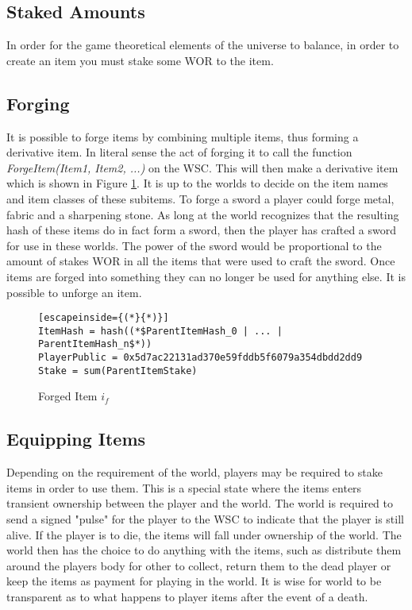 \documentclass[runningheads,a4paper]{llncs}
\begin{document}
\subsection{Staked Amounts}
In order for the game theoretical elements of the universe to balance, in order to create an item you must stake some WOR to the item.

\subsection{Forging}
It is possible to forge items by combining multiple items, thus forming a derivative item. In literal sense the act of forging it to call the function \textit{ForgeItem(Item1, Item2, ...)} on the WSC. This will then make a derivative item which is shown in Figure \ref{ForgedItem}. It is up to the worlds to decide on the item names and item classes of these subitems. To forge a sword a player could forge metal, fabric and a sharpening stone. As long at the world recognizes that the resulting hash of these items do in fact form a sword, then the player has crafted a sword for use in these worlds. The power of the sword would be proportional to the amount of stakes WOR in all the items that were used to craft the sword. Once items are forged into something they can no longer be used for anything else. It is possible to unforge an item.

\begin{figure}[H]
\centering
\caption{Forged Item $i_f$}
\label{ForgedItem}
\begin{lstlisting}[escapeinside={(*}{*)}]
ItemHash = hash((*$ParentItemHash_0 | ... | ParentItemHash_n$*))
PlayerPublic = 0x5d7ac22131ad370e59fddb5f6079a354dbdd2dd9
Stake = sum(ParentItemStake)
\end{lstlisting}
\end{figure}

\subsection{Equipping Items}
Depending on the requirement of the world, players may be required to stake items in order to use them. This is a special state where the items enters transient ownership between the player and the world. The world is required to send a signed "pulse" for the player to the WSC to indicate that the player is still alive. If the player is to die, the items will fall under ownership of the world. The world then has the choice to do anything with the items, such as distribute them around the players body for other to collect, return them to the dead player or keep the items as payment for playing in the world. It is wise for world to be transparent as to what happens to player items after the event of a death.
\end{document}
